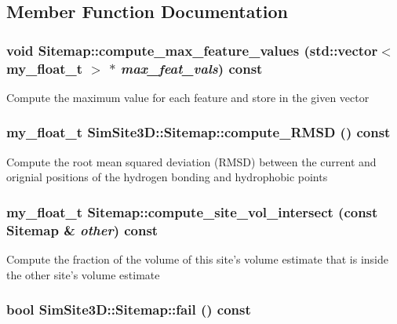 \subsection{Member Function Documentation}
\subsubsection{\setlength{\rightskip}{0pt plus 5cm}void Sitemap::compute\_\-max\_\-feature\_\-values (std::vector$<$ my\_\-float\_\-t $>$ $\ast$ {\em max\_\-feat\_\-vals}) const}\label{classSimSite3D_1_1Sitemap_2fc4a9ede3730c0cd6fdadc97f00864b}


Compute the maximum value for each feature and store in the given vector 
\subsubsection{\setlength{\rightskip}{0pt plus 5cm}my\_\-float\_\-t SimSite3D::Sitemap::compute\_\-RMSD () const\hspace{0.3cm}{\tt  [inline]}}\label{classSimSite3D_1_1Sitemap_81fe70b16f0e030e8c20923fc2e66a49}


Compute the root mean squared deviation (RMSD) between the current and orignial positions of the hydrogen bonding and hydrophobic points 
\subsubsection{\setlength{\rightskip}{0pt plus 5cm}my\_\-float\_\-t Sitemap::compute\_\-site\_\-vol\_\-intersect (const \bf{Sitemap} \& {\em other}) const}\label{classSimSite3D_1_1Sitemap_8865b700374d55d3e7b4d6c4cd489f60}


Compute the fraction of the volume of this site's volume estimate that is inside the other site's volume estimate 
\subsubsection{\setlength{\rightskip}{0pt plus 5cm}bool SimSite3D::Sitemap::fail () const\hspace{0.3cm}{\tt  [inline]}}\label{classSimSite3D_1_1Sitemap_1a15e9045f766ba8e80f6411513de6ac}


